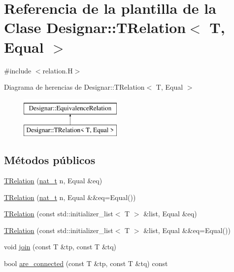 \hypertarget{class_designar_1_1_t_relation}{}\section{Referencia de la plantilla de la Clase Designar\+:\+:T\+Relation$<$ T, Equal $>$}
\label{class_designar_1_1_t_relation}


{\ttfamily \#include $<$relation.\+H$>$}

Diagrama de herencias de Designar\+:\+:T\+Relation$<$ T, Equal $>$\begin{figure}[H]
\begin{center}
\leavevmode
\includegraphics[height=2.000000cm]{class_designar_1_1_t_relation}
\end{center}
\end{figure}
\subsection*{Métodos públicos}
\begin{DoxyCompactItemize}
\item 
\hyperlink{class_designar_1_1_t_relation_a1f409c1d5959b2771c31e1f7e92664cf}{T\+Relation} (\hyperlink{namespace_designar_aa72662848b9f4815e7bf31a7cf3e33d1}{nat\+\_\+t} n, Equal \&eq)
\item 
\hyperlink{class_designar_1_1_t_relation_ab6e9dc668ef079b565153eb49b45629c}{T\+Relation} (\hyperlink{namespace_designar_aa72662848b9f4815e7bf31a7cf3e33d1}{nat\+\_\+t} n, Equal \&\&eq=Equal())
\item 
\hyperlink{class_designar_1_1_t_relation_a176c516d96ff9476d54b0e76497d224b}{T\+Relation} (const std\+::initializer\+\_\+list$<$ T $>$ \&list, Equal \&eq)
\item 
\hyperlink{class_designar_1_1_t_relation_ac745ed02be7d1aac2a70473fc1d4b4b7}{T\+Relation} (const std\+::initializer\+\_\+list$<$ T $>$ \&list, Equal \&\&eq=Equal())
\item 
void \hyperlink{class_designar_1_1_t_relation_a484b21a54f5d2b9862487fbb8b5ac1e7}{join} (const T \&tp, const T \&tq)
\item 
bool \hyperlink{class_designar_1_1_t_relation_a1746e01b4c0e1d96aca73ad8d6b66ad1}{are\+\_\+connected} (const T \&tp, const T \&tq) const
\end{DoxyCompactItemize}


